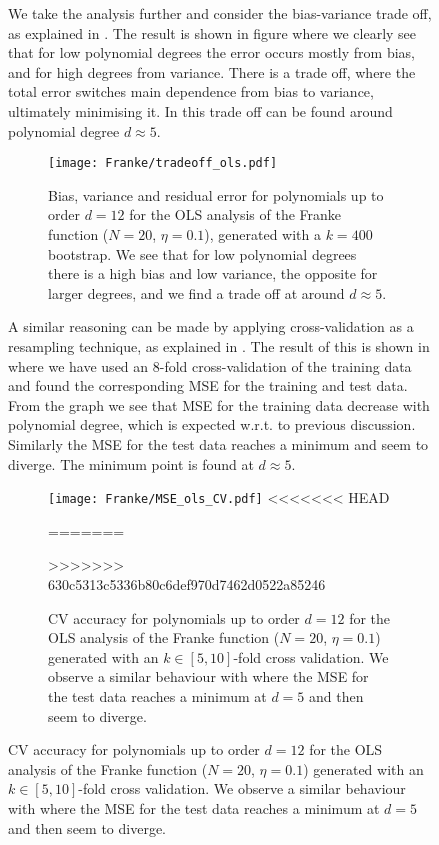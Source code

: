 \begin{figure}
            We take the analysis further and consider the bias-variance trade off, as explained in . The result is shown in figure   where we clearly see that for low polynomial degrees the error occurs mostly from bias, and for high degrees from  variance. There is a trade off, where the  total error switches  main dependence from bias to variance, ultimately minimising it. In  this  trade off can be found around polynomial degree $d\approx 5$.

            
            \begin{figure}
                \texttt{[image: Franke/tradeoff\_ols.pdf]}
                \caption{Bias, variance and residual error for polynomials up to order $d=12$ for the OLS analysis of the Franke function ($N=20$, $\eta=0.1$), generated with a $k=400$ bootstrap. We see that for low polynomial degrees there is a high bias and low variance, the opposite for larger degrees, and we find a trade off at around $d\approx 5$.}
                \label{fig:bias_variance_ols}
            \end{figure}
            
            
            A similar reasoning can be made by applying cross-validation as a resampling technique, as explained in . The result of this is shown in  where we have used an 8-fold cross-validation of the training data and found the corresponding MSE for the training and test data. From the graph we see that MSE for the training data decrease with polynomial degree, which is expected w.r.t. to previous discussion. Similarly the MSE for the test data reaches a minimum and seem to diverge. The minimum point is found at $d\approx 5$.

            \begin{figure}
                \texttt{[image: Franke/MSE\_ols\_CV.pdf]}
<<<<<<< HEAD
                \caption{MSE for test data for polynomials up to order $d=12$ for the OLS analysis of the Franke function ($N=20$, $\eta=0.1$) generated with an $k\in[5,10]$-fold cross-validation. We observe a similar behaviour with  where the MSE for the test data reaches a minimum at $d=5$ and then seem to diverge. }
=======
                \caption{CV accuracy for polynomials up to order $d=12$ for the OLS analysis of the Franke function ($N=20$, $\eta=0.1$) generated with an $k\in[5,10]$-fold cross validation. We observe a similar behaviour with  where the MSE for the test data reaches a minimum at $d=5$ and then seem to diverge. }
>>>>>>> 630c5313c5336b80c6def970d7462d0522a85246
                \label{fig:cross-validation_ols}
            \end{figure} 
            

\end{figure}
